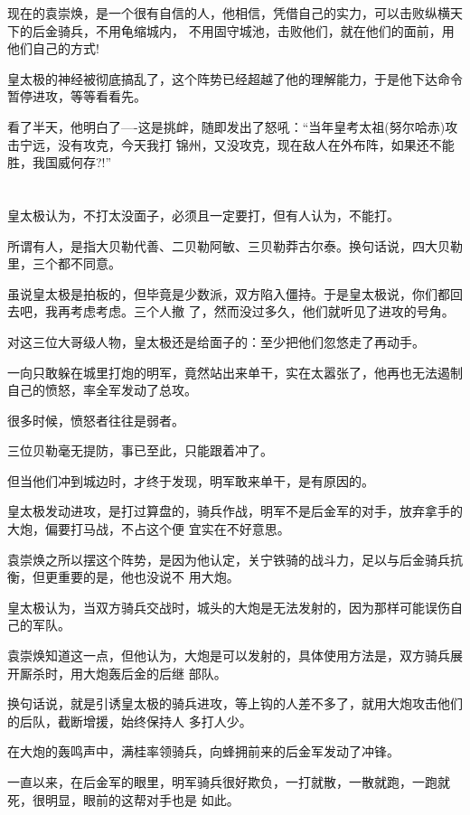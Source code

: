 \documentclass[11pt,a4paper,onecolumn]{article}
\begin{document}
现在的袁崇焕，是一个很有自信的人，他相信，凭借自己的实力，可以击败纵横天下的后金骑兵，不用龟缩城内，
不用固守城池，击败他们，就在他们的面前，用他们自己的方式!

皇太极的神经被彻底搞乱了，这个阵势已经超越了他的理解能力，于是他下达命令暂停进攻，等等看看先。

看了半天，他明白了----这是挑衅，随即发出了怒吼：``当年皇考太祖(努尔哈赤)攻击宁远，没有攻克，今天我打
锦州，又没攻克，现在敌人在外布阵，如果还不能胜，我国威何存?!''

\section[\thesection]{}

皇太极认为，不打太没面子，必须且一定要打，但有人认为，不能打。

所谓有人，是指大贝勒代善、二贝勒阿敏、三贝勒莽古尔泰。换句话说，四大贝勒里，三个都不同意。

虽说皇太极是拍板的，但毕竟是少数派，双方陷入僵持。于是皇太极说，你们都回去吧，我再考虑考虑。三个人撤
了，然而没过多久，他们就听见了进攻的号角。

对这三位大哥级人物，皇太极还是给面子的：至少把他们忽悠走了再动手。

一向只敢躲在城里打炮的明军，竟然站出来单干，实在太嚣张了，他再也无法遏制自己的愤怒，率全军发动了总攻。

很多时候，愤怒者往往是弱者。

三位贝勒毫无提防，事已至此，只能跟着冲了。

但当他们冲到城边时，才终于发现，明军敢来单干，是有原因的。

皇太极发动进攻，是打过算盘的，骑兵作战，明军不是后金军的对手，放弃拿手的大炮，偏要打马战，不占这个便
宜实在不好意思。

袁崇焕之所以摆这个阵势，是因为他认定，关宁铁骑的战斗力，足以与后金骑兵抗衡，但更重要的是，他也没说不
用大炮。

皇太极认为，当双方骑兵交战时，城头的大炮是无法发射的，因为那样可能误伤自己的军队。

袁崇焕知道这一点，但他认为，大炮是可以发射的，具体使用方法是，双方骑兵展开厮杀时，用大炮轰后金的后继
部队。

换句话说，就是引诱皇太极的骑兵进攻，等上钩的人差不多了，就用大炮攻击他们的后队，截断增援，始终保持人
多打人少。

在大炮的轰鸣声中，满桂率领骑兵，向蜂拥前来的后金军发动了冲锋。

一直以来，在后金军的眼里，明军骑兵很好欺负，一打就散，一散就跑，一跑就死，很明显，眼前的这帮对手也是
如此。
\end{document}
